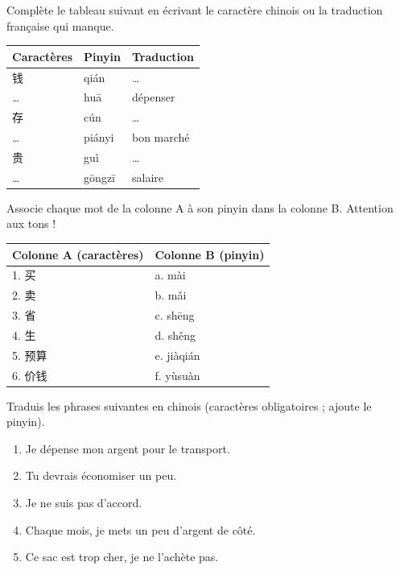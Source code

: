 \documentclass[11pt]{article}
\newcounter{popsec}
\newcounter{popsub}
\newcommand{\courssub}[1]{%
  \stepcounter{popsub}%
  \par\vspace{9pt}\noindent{\popxbold\fontsize{11.5}{13}\selectfont\color{popink}{\color{poporange}\thepopsec.\thepopsub}\hspace{6pt}#1}\par\nopagebreak\vspace{4pt}
}
\begin{document}
\begin{exercice}
Complète le tableau suivant en écrivant le caractère chinois ou la traduction française qui manque.
\begin{center}
\begin{tabularx}{\linewidth}{|X|X|X|}
\hline
\rowcolor{popblueL} Caractères & Pinyin & Traduction \\
\hline
钱 & qián & \ldots \\
\hline
\ldots & huā & dépenser \\
\hline
存 & cún & \ldots \\
\hline
\ldots & piányi & bon marché \\
\hline
贵 & guì & \ldots \\
\hline
\ldots & gōngzī & salaire \\
\hline
\end{tabularx}
\end{center}
\end{exercice}

\begin{exercice}
Associe chaque mot de la colonne A à son pinyin dans la colonne B. Attention aux tons !
\begin{center}
\begin{tabularx}{\linewidth}{|X|X|}
\hline
\rowcolor{popblueL} Colonne A (caractères) & Colonne B (pinyin) \\
\hline
1. 买 & a. mài \\
\hline
2. 卖 & b. mǎi \\
\hline
3. 省 & c. shēng \\
\hline
4. 生 & d. shěng \\
\hline
5. 预算 & e. jiàqián \\
\hline
6. 价钱 & f. yùsuàn \\
\hline
\end{tabularx}
\end{center}
\end{exercice}

\courssub{Je m'entraîne}

\begin{exercice}
Traduis les phrases suivantes en chinois (caractères obligatoires ; ajoute le pinyin).
\begin{enumerate}
\item Je dépense mon argent pour le transport.
\item Tu devrais économiser un peu.
\item Je ne suis pas d'accord.
\item Chaque mois, je mets un peu d'argent de côté.
\item Ce sac est trop cher, je ne l'achète pas.
\end{enumerate}
\end{exercice}
\end{document}
